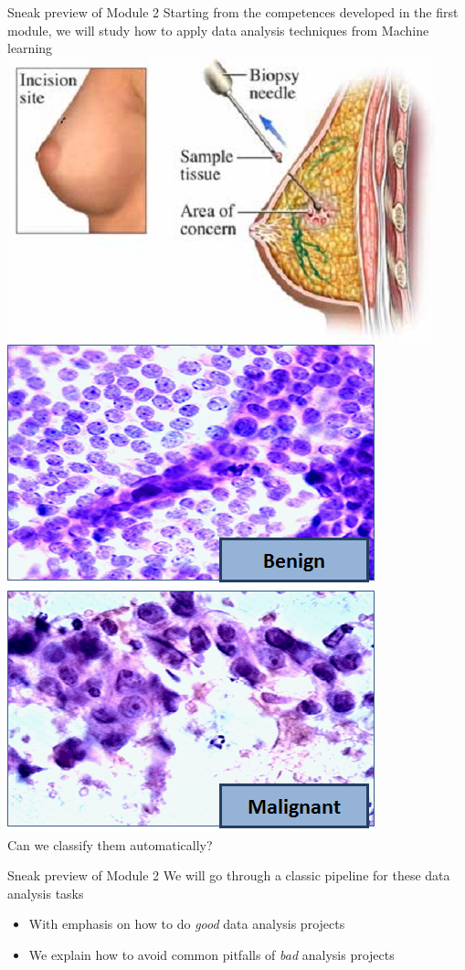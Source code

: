 \documentclass{beamer}%
\begin{document}
\begin{frame}{Sneak preview of Module 2}
	\centering 
	Starting from the competences developed in the first module, we will study
	how to apply data analysis techniques from Machine learning
	\includegraphics[width=0.4\linewidth]{figures/Breast-Biopsy-2.jpg}\\
	\includegraphics[width=0.4\linewidth]{figures/fna-benign1.png}
	\includegraphics[width=0.4\linewidth]{figures/fna-malignant1.png}\\
	Can we classify them automatically?
\end{frame}

\begin{frame}{Sneak preview of Module 2}
	We will go through a classic pipeline for these data analysis tasks
\begin{itemize}
	\item With emphasis on how to do \emph{good} data analysis projects
	\item We explain how to avoid common pitfalls of \emph{bad} analysis projects
	\end{itemize}		
\end{frame}
\end{document}
